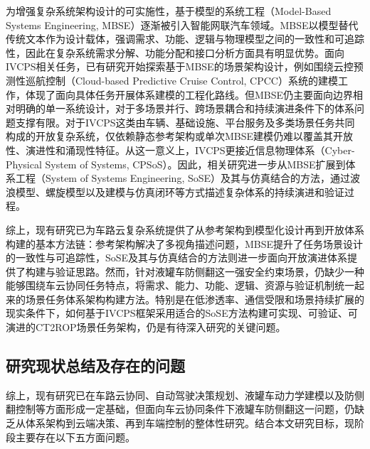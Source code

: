     为增强复杂系统架构设计的可实施性，基于模型的系统工程（Model-Based Systems Engineering, MBSE）逐渐被引入智能网联汽车领域。MBSE以模型替代传统文本作为设计载体，强调需求、功能、逻辑与物理模型之间的一致性和可追踪性，因此在复杂系统需求分解、功能分配和接口分析方面具有明显优势。面向IVCPS相关任务，已有研究开始探索基于MBSE的场景架构设计，例如围绕云控预测性巡航控制（Cloud-based Predictive Cruise Control, CPCC）系统的建模工作，体现了面向具体任务开展体系建模的工程化路线\cite{xu2023mbseivcps}。但MBSE仍主要面向边界相对明确的单一系统设计，对于多场景并行、跨场景耦合和持续演进条件下的体系问题支撑有限。对于IVCPS这类由车辆、基础设施、平台服务及多类场景任务共同构成的开放复杂系统，仅依赖静态参考架构或单次MBSE建模仍难以覆盖其开放性、演进性和涌现性特征。从这一意义上，IVCPS更接近信息物理体系（Cyber-Physical System of Systems, CPSoS）。因此，相关研究进一步从MBSE扩展到体系工程（System of Systems Engineering, SoSE）及其与仿真结合的方法，通过波浪模型、螺旋模型以及建模与仿真闭环等方式描述复杂体系的持续演进和验证过程\cite{wangweiping2019mbse,fengyimin2024soseframework,liminghua2021aerospace,zhanglin2022sosembs,liuxinghua2011sysmlsimulink,liutonglei2015tripleredundant,zhangshaojie2018mbsecivilaircraft,weicaise2021airsensor,guoyuliang2023door,qinchangmao2021remoteexpert,liuyang2024soseoutlook}。


    综上，现有研究已为车路云复杂系统提供了从参考架构到模型化设计再到开放体系构建的基本方法链：参考架构解决了多视角描述问题，MBSE提升了任务场景设计的一致性与可追踪性，SoSE及其与仿真结合的方法则进一步面向开放演进体系提供了构建与验证思路。然而，针对液罐车防侧翻这一强安全约束场景，仍缺少一种能够围绕车云协同任务特点，将需求、能力、功能、逻辑、资源与验证机制统一起来的场景任务体系架构构建方法。特别是在低渗透率、通信受限和场景持续扩展的现实条件下，如何基于IVCPS框架采用适合的SoSE方法构建可实现、可验证、可演进的CT2ROP场景任务架构，仍是有待深入研究的关键问题。

  \subsection{研究现状总结及存在的问题}

    综上，现有研究已在车路云协同、自动驾驶决策规划、液罐车动力学建模以及防侧翻控制等方面形成一定基础，但面向车云协同条件下液罐车防侧翻这一问题，仍缺乏从体系架构到云端决策、再到车端控制的整体性研究。结合本文研究目标，现阶段主要存在以下五方面问题。

